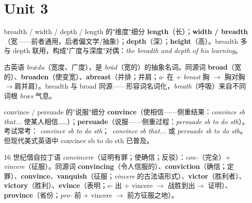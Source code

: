 \documentclass[../main.tex]{subfiles}
\begin{document}
\section{Unit 3}




\begin{gram}{breadth / width / depth / length 的"维度"细分}
\textbf{length}（长）；\textbf{width / breadth}（宽——前者通用，后者偏文学/抽象）；\textbf{depth}（深）；\textbf{height}（高）。breadth 多与 depth 联用，构成"广度与深度"对偶：\textit{the breadth and depth of his learning}。
\end{gram}

\begin{origin}
古英语 \textit{brǣdu}（宽度、广度），是 \textit{brād}（宽的）的抽象名词。同源词 \textbf{broad}（宽的）、\textbf{broaden}（使变宽）、\textbf{abreast}（并排；并肩；\textit{a-} 在 + \textit{breast} 胸 $\to$ 胸对胸$\to$肩并肩）。breadth 与 broad 同源——形容词名词化，\textit{breath}（呼吸）来自不同词根 \textit{bræs} 气息。
\end{origin}




\begin{gram}{convince / persuade 的"说服"细分}
\textbf{convince}（使相信——侧重结果：\textit{convince sb that...} 使某人相信……）；\textbf{persuade}（说服——侧重过程：\textit{persuade sb to do sth}）。考试常考： \textit{convince sb to do sth}；\checkmark\ \textit{convince sb that...} 或 \textit{persuade sb to do sth}。但现代美式英语中 convince sb to do sth 已普及。
\end{gram}

\begin{origin}
16 世纪借自拉丁语 \textit{convincere}（证明有罪；使确信；反驳）：\textit{con-}（完全）+ \textit{vincere}（征服）。同源词 \textbf{convincing}（令人信服的）、\textbf{conviction}（确信；定罪）、\textbf{convince}、\textbf{vanquish}（征服；\textit{vincere} 的古法语形式）、\textbf{victor}（胜利者）、\textbf{victory}（胜利）、\textbf{evince}（表明；\textit{e-} 出 + vincere $\to$ 战胜到出$\to$ 证明）、\textbf{province}（省份；\textit{pro-} 前 + vincere $\to$ 前方征服之地）。
\end{origin}
\end{document}

